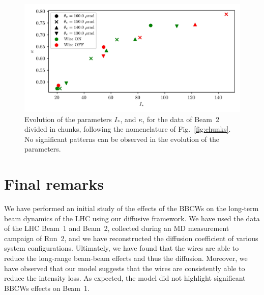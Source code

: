 \begin{figure}[hpt]
    \centering
    \includegraphics[width=1.0\textwidth]{5_wire_compensators_LHC/figs/fokker_planck_b2.jpg}
    \caption{Evolution of the parameters $I_\ast$, and $\kappa$, for the data of Beam~2 divided in chunks, following the nomenclature of Fig.~\ref{fig:chunks}. No significant patterns can be observed in the evolution of the parameters.}
    \label{fig:parameters_3}
\end{figure}


\section{Final remarks}\label{sec:5:conclusions}

We have performed an initial study of the effects of the BBCWs on the long-term beam dynamics of the LHC using our diffusive framework. We have used the data of the LHC Beam~1 and Beam~2, collected during an MD measurement campaign of Run~2, and we have reconstructed the diffusion coefficient of various system configurations. Ultimately, we have found that the wires are able to reduce the long-range beam-beam effects and thus the diffusion. Moreover, we have observed that our model suggests that the wires are consistently able to reduce the intensity loss. As expected, the model did not highlight significant BBCWs effects on Beam~1.

